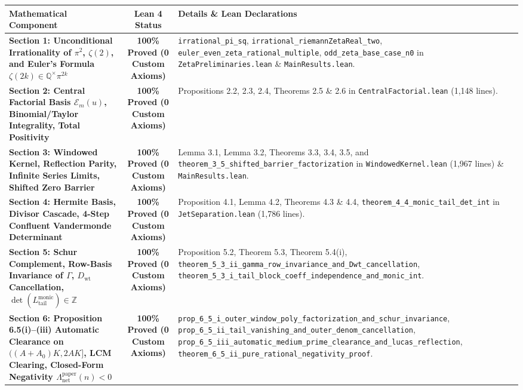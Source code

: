 \documentclass[11pt,a4paper]{article}
\begin{document}
\begin{table}[h!]
\centering
\small
\begin{tabular}{p{5.2cm}cp{7.5cm}}
\toprule
\textbf{Mathematical Component} & \textbf{Lean 4 Status} & \textbf{Details \& Lean Declarations} \\
\midrule
\textbf{Section 1: Unconditional Irrationality of $\pi^2$, $\zeta(2)$, and Euler's Formula $\zeta(2k) \in \mathbb{Q}^\times \pi^{2k}$} & \textcolor{green!50!black}{\textbf{100\% Proved (0 Custom Axioms)}} & \texttt{irrational\_pi\_sq}, \texttt{irrational\_riemannZetaReal\_two}, \texttt{euler\_even\_zeta\_rational\_multiple}, \texttt{odd\_zeta\_base\_case\_n0} in \texttt{ZetaPreliminaries.lean} \& \texttt{MainResults.lean}. \\
\midrule
\textbf{Section 2: Central Factorial Basis $\mathcal{E}_m(u)$, Binomial/Taylor Integrality, Total Positivity} & \textcolor{green!50!black}{\textbf{100\% Proved (0 Custom Axioms)}} & Propositions 2.2, 2.3, 2.4, Theorems 2.5 \& 2.6 in \texttt{CentralFactorial.lean} (1,148 lines). \\
\midrule
\textbf{Section 3: Windowed Kernel, Reflection Parity, Infinite Series Limits, Shifted Zero Barrier} & \textcolor{green!50!black}{\textbf{100\% Proved (0 Custom Axioms)}} & Lemma 3.1, Lemma 3.2, Theorems 3.3, 3.4, 3.5, and \texttt{theorem\_3\_5\_shifted\_barrier\_factorization} in \texttt{WindowedKernel.lean} (1,967 lines) \& \texttt{MainResults.lean}. \\
\midrule
\textbf{Section 4: Hermite Basis, Divisor Cascade, 4-Step Confluent Vandermonde Determinant} & \textcolor{green!50!black}{\textbf{100\% Proved (0 Custom Axioms)}} & Proposition 4.1, Lemma 4.2, Theorems 4.3 \& 4.4, \texttt{theorem\_4\_4\_monic\_tail\_det\_int} in \texttt{JetSeparation.lean} (1,786 lines). \\
\midrule
\textbf{Section 5: Schur Complement, Row-Basis Invariance of $\Gamma$, $D_{\mathrm{wt}}$ Cancellation, $\det(L_{\mathrm{tail}}^{\mathrm{monic}}) \in \mathbb{Z}$} & \textcolor{green!50!black}{\textbf{100\% Proved (0 Custom Axioms)}} & Proposition 5.2, Theorem 5.3, Theorem 5.4(i), \texttt{theorem\_5\_3\_ii\_gamma\_row\_invariance\_and\_Dwt\_cancellation}, \texttt{theorem\_5\_3\_i\_tail\_block\_coeff\_independence\_and\_monic\_int}. \\
\midrule
\textbf{Section 6: Proposition 6.5(i)--(iii) Automatic Clearance on $((A+A_0)K, 2AK]$, LCM Clearing, Closed-Form Negativity $\Lambda_{\mathrm{net}}^{\mathrm{paper}}(n) < 0$} & \textcolor{green!50!black}{\textbf{100\% Proved (0 Custom Axioms)}} & \texttt{prop\_6\_5\_i\_outer\_window\_poly\_factorization\_and\_schur\_invariance}, \texttt{prop\_6\_5\_ii\_tail\_vanishing\_and\_outer\_denom\_cancellation}, \texttt{prop\_6\_5\_iii\_automatic\_medium\_prime\_clearance\_and\_lucas\_reflection}, \texttt{theorem\_6\_5\_ii\_pure\_rational\_negativity\_proof}. \\

\end{tabular}
\end{table}
\end{document}
